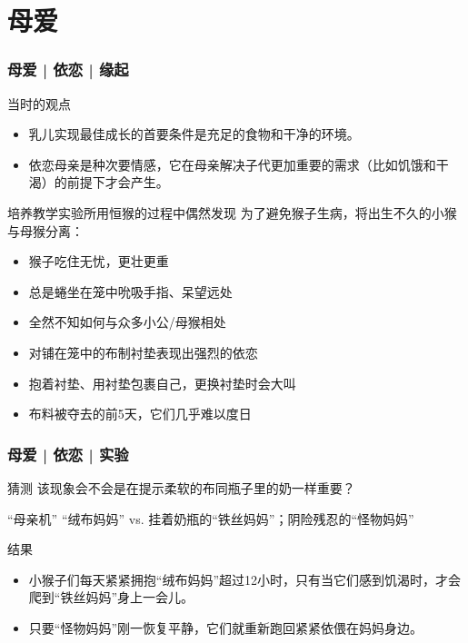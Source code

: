\section{母爱}
\begin{frame}
  \frametitle{母爱 | 依恋 | 缘起}
  \begin{block}{当时的观点}
    \begin{itemize}
      \item 乳儿实现最佳成长的首要条件是充足的食物和干净的环境。
      \item 依恋母亲是种次要情感，它在母亲解决子代更加重要的需求（比如饥饿和干渴）的前提下才会产生。
    \end{itemize}
  \end{block}
  \pause
  \begin{block}{培养教学实验所用恒猴的过程中偶然发现}
    为了避免猴子生病，将出生不久的小猴与母猴分离：
    \begin{itemize}
      \item 猴子吃住无忧，更壮更重
      \item 总是蜷坐在笼中吮吸手指、呆望远处
      \item 全然不知如何与众多小公/母猴相处
      \item 对铺在笼中的布制衬垫表现出强烈的依恋
      \item 抱着衬垫、用衬垫包裹自己，更换衬垫时会大叫
      \item 布料被夺去的前5天，它们几乎难以度日
    \end{itemize}
  \end{block}
\end{frame}

\begin{frame}
  \frametitle{母爱 | 依恋 | 实验}
  \begin{block}{猜测}
    该现象会不会是在提示柔软的布同瓶子里的奶一样重要？
  \end{block}
  \vspace{-0.5em}
  \pause
  \begin{block}{“母亲机”}
      “绒布妈妈” vs. 挂着奶瓶的“铁丝妈妈”；阴险残忍的“怪物妈妈”
  \end{block}
  \vspace{-0.5em}
  \pause
  \begin{block}{结果}
    \begin{itemize}
      \item 小猴子们每天紧紧拥抱“绒布妈妈”超过12小时，只有当它们感到饥渴时，才会爬到“铁丝妈妈”身上一会儿。
      \item 只要“怪物妈妈”刚一恢复平静，它们就重新跑回紧紧依偎在妈妈身边。
    \end{itemize}
    \vspace{-2.2em}
    \begin{figure}
      \centering
      \qquad
    \end{figure}
  \end{block}
\end{frame}

